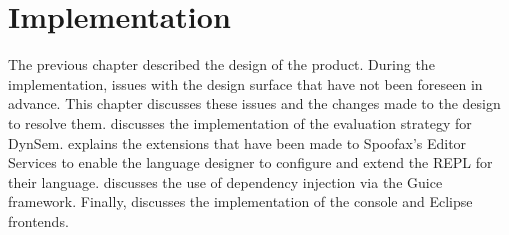 \chapter{Implementation}
\label{cha:implementation}

The previous chapter described the design of the product. During the
implementation, issues with the design surface that have not been foreseen in
advance. This chapter discusses these issues and the changes made to the design
to resolve them.  discusses the implementation of
the evaluation strategy for DynSem.  explains the
extensions that have been made to Spoofax's Editor Services to enable the
language designer to configure and extend the REPL for their
language.  discusses the use of dependency injection via the
Guice framework. Finally,  discusses the implementation of
the console and Eclipse frontends.







